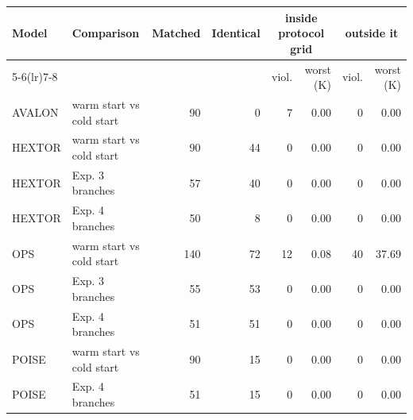 \footnotesize
\begin{tabular}{llrrrrrr}
\toprule
Model & Comparison & Matched & Identical & \multicolumn{2}{c}{inside protocol grid} & \multicolumn{2}{c}{outside it} \\
\cmidrule(lr){5-6}\cmidrule(lr){7-8}
 & & & & viol. & worst (K) & viol. & worst (K) \\
\midrule
AVALON & warm start vs cold start & 90 & 0 & 7 & 0.00 & 0 & 0.00 \\
HEXTOR & warm start vs cold start & 90 & 44 & 0 & 0.00 & 0 & 0.00 \\
HEXTOR & Exp. 3 branches & 57 & 40 & 0 & 0.00 & 0 & 0.00 \\
HEXTOR & Exp. 4 branches & 50 & 8 & 0 & 0.00 & 0 & 0.00 \\
OPS & warm start vs cold start & 140 & 72 & 12 & 0.08 & 40 & 37.69 \\
OPS & Exp. 3 branches & 55 & 53 & 0 & 0.00 & 0 & 0.00 \\
OPS & Exp. 4 branches & 51 & 51 & 0 & 0.00 & 0 & 0.00 \\
POISE & warm start vs cold start & 90 & 15 & 0 & 0.00 & 0 & 0.00 \\
POISE & Exp. 4 branches & 51 & 15 & 0 & 0.00 & 0 & 0.00 \\
\bottomrule
\end{tabular}
